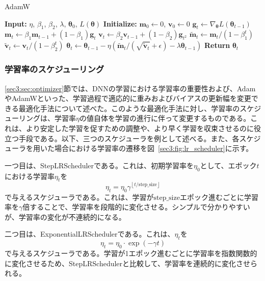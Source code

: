 \documentclass[12pt]{jarticle}
\numberwithin{equation}{section}    %
\numberwithin{figure}{section}      %
\numberwithin{table}{section}      %
\begin{document}
\begin{algorithm}
    \caption{AdamW}
    \label{sec3:algo:adamw}
    \begin{algorithmic}[1]
        \State \textbf{Input:} $\eta$, $\beta_{1}$, $\beta_{2}$, $\lambda$, $\bm{\theta}_{0}$, $L(\bm{\theta})$
        \State \textbf{Initialize:} $\bm{m}_{0} \gets 0$, $\bm{v}_{0} \gets 0$
        \State $\bm{g}_{t} \gets \nabla_{\bm{\theta}} L(\bm{\theta}_{t-1})$
        \State $\bm{m}_{t} \gets \beta_{1} \bm{m}_{t-1} + (1 - \beta_{1}) \bm{g}_{t}$
        \State $\bm{v}_{t} \gets \beta_{2} \bm{v}_{t-1} + (1 - \beta_{2}) \bm{g}_{t^{2}}$
        \State $\tilde{\bm{m}}_{t} \gets \bm{m}_{t} / (1 - \beta_{1}^{t})$
        \State $\tilde{\bm{v}}_{t} \gets \bm{v}_{t} / (1 - \beta_{2}^{t})$
        \State $\bm{\theta}_{t} \gets \bm{\theta}_{t-1} - \eta (\tilde{\bm{m}}_{t} / (\sqrt{\tilde{\bm{v}}_{t}} + \epsilon) - \lambda \bm{\theta}_{t - 1})$
        \EndFor
        \State \textbf{Return} $\bm{\theta}_{t}$
    \end{algorithmic}
\end{algorithm}

\subsubsection{学習率のスケジューリング}
\ref{sec3:sec:optimizer}節では、DNNの学習における学習率の重要性および、AdamやAdamWといった、学習過程で適応的に重みおよびバイアスの更新幅を変更できる最適化手法について述べた。このような最適化手法に対し、学習率のスケジューリングは、学習率$\eta$の値自体を学習の進行に伴って変更するものである。これは、より安定した学習を促すための調整や、より早く学習を収束させるのに役立つ手段である。以下、三つのスケジューラを例として述べる。また、各スケジューラを用いた場合における学習率の遷移を図~\ref{sec3:fig:lr_scheduler}に示す。

一つ目は、StepLRSchedulerである。これは、初期学習率を$\eta_{0}$として、エポック$t$における学習率$\eta_{t}$を
\begin{equation}
    \eta_{t} = \eta_{0} \gamma^{\left\lfloor t / \text{step\_size} \right\rfloor}
\end{equation}
で与えるスケジューラである。これは、学習が$\text{step\_size}$エポック進むごとに学習率を$\gamma$倍することで、学習率を段階的に変化させる。シンプルで分かりやすいが、学習率の変化が不連続的になる。

二つ目は、ExponentialLRSchedulerである。これは、$\eta_{t}$を
\begin{equation}
    \eta_{t} = \eta_{0} \cdot \exp \left( -\gamma t \right)
\end{equation}
で与えるスケジューラである。学習が1エポック進むごとに学習率を指数関数的に変化させるため、StepLRSchedulerと比較して、学習率を連続的に変化させられる。
\end{document}
